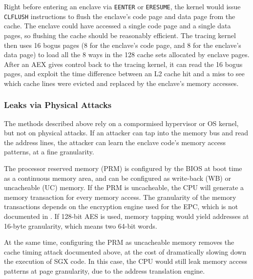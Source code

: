 Right before entering an enclave via \texttt{EENTER} or \texttt{ERESUME}, the
kernel would issue \texttt{CLFLUSH} instructions to flush the enclave's code
page and data page from the cache. The enclave could have accessed a single
code page and a single data pages, so flushing the cache should be reasonably
efficient. The tracing kernel then uses 16 bogus pages (8 for the enclave's
code page, and 8 for the enclave's data page) to load all the 8 ways in the 128
cache sets allocated by enclave pages. After an AEX gives control back to the
tracing kernel, it can read the 16 bogus pages, and exploit the time difference
between an L2 cache hit and a miss to see which cache lines were evicted and
replaced by the enclave's memory accesses.

\subsubsection{Leaks via Physical Attacks}

The methods described above rely on a compormised hypervisor or OS kernel, but
not on physical attacks. If an attacker can tap into the memory bus and read
the address lines, the attacker can learn the enclave code's memory access
patterns, at a fine granularity.

The processor reserved memory (PRM) is configured by the BIOS at boot time as
a continuous memory area, and can be configured as write-back (WB) or
uncacheable (UC) memory. If the PRM is uncacheable, the CPU will generate a
memory transaction for every memory access. The granularity of the memory
transactions depends on the encryption engine used for the EPC, which is not
documented in \cite{intel2013sgxmanual}. If 128-bit AES is used, memory tapping
would yield addresses at 16-byte granularity, which means two 64-bit words.

At the same time, configuring the PRM as uncacheable memory removes the cache
timing attack documented above, at the cost of dramatically slowing down the
execution of SGX code. In this case, the CPU would still leak memory access
patterns at page granularity, due to the address translation engine.
